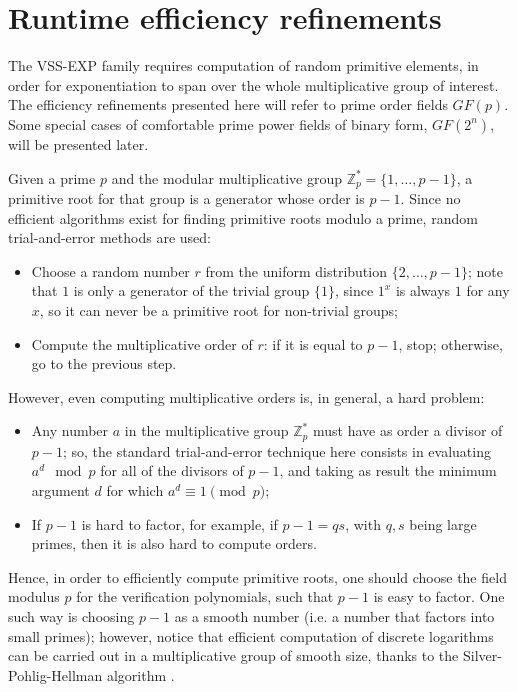 \documentclass[10pt,journal,cspaper,compsoc]{IEEEtran}
\begin{document}
\section{Runtime efficiency refinements}
\label{runtime-efficiency-section}
The VSS-EXP family requires computation of random primitive elements, in order for exponentiation to span over the whole multiplicative group of interest. The efficiency refinements presented here will refer to prime order fields $GF(p)$. Some special cases of comfortable prime power fields of binary form, $GF(2^n)$, will be presented later.

Given a prime $p$ and the modular multiplicative group ${\mathbb{Z}_p^* = \{1,\ldots,p-1\}}$, a primitive root for that group is a generator whose order is $p-1$.
Since no efficient algorithms exist for finding primitive roots modulo a prime, random trial-and-error methods are used:

\begin{itemize}
\item Choose a random number $r$ from the uniform distribution ${\{2,\ldots,p-1\}}$; note that $1$ is only a generator of the trivial group $\{1\}$, since $1^x$ is always $1$ for any $x$, so it can never be a primitive root for non-trivial groups;
\item Compute the multiplicative order of $r$: if it is equal to $p-1$, stop; otherwise, go to the previous step.
\end{itemize}

However, even computing multiplicative orders is, in general, a hard problem: 

\begin{itemize}
\item Any number $a$ in the multiplicative group $\mathbb{Z}_p^*$ must have as order a divisor of $p-1$; so, the standard trial-and-error technique here consists in evaluating ${a^d \mod p}$ for all of the divisors of $p-1$, and taking as result the minimum argument $d$ for which $a^d \equiv 1 \pmod p$;
\item If $p-1$ is hard to factor, for example, if $p-1 = qs$, with $q,s$ being large primes, then it is also hard to compute orders.
\end{itemize}

Hence, in order to efficiently compute primitive roots, one should choose the field modulus $p$ for the verification polynomials, such that $p-1$ is easy to factor. One such way is choosing $p-1$ as a smooth number (i.e. a number that factors into small primes); however, notice that efficient computation of discrete logarithms can be carried out in a multiplicative group of smooth size, thanks to the Silver-Pohlig-Hellman algorithm \cite{Mollin:2008:FNT:1628707}.
\end{document}
